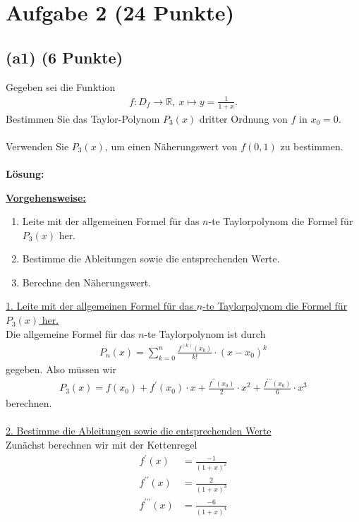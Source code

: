 \section*{Aufgabe 2 (24 Punkte)}
\vspace{0.4cm}
\subsection*{(a1) (6 Punkte)}
Gegeben sei die Funktion
\begin{align*}
f: D_f \to \mathbb{R}, \ x \mapsto y= \frac{1}{1+x}.
\end{align*}
Bestimmen Sie das Taylor-Polynom $P_3(x)$ dritter Ordnung von $f$ in $x_0 = 0$.\\
\\
Verwenden Sie $P_3(x)$, um einen Näherungswert von $f(0,1)$ zu bestimmen.
\\
\\
\textbf{Lösung:}
\begin{mdframed}
\underline{\textbf{Vorgehensweise:}}
\begin{enumerate}
\item Leite mit der allgemeinen Formel für das $n$-te Taylorpolynom die Formel für $P_3(x)$ her.
\item Bestimme die Ableitungen sowie die entsprechenden Werte.
\item Berechne den Näherungswert. 
\end{enumerate}
\end{mdframed}
\underline{1. Leite mit der allgemeinen Formel für das $n$-te Taylorpolynom die Formel für $P_3(x)$ her. }\\
Die allgemeine Formel für das $n$-te Taylorpolynom ist durch
\begin{align*}
P_n(x) = \sum \limits_{k=0}^n \frac{f^{(k)}(x_0)}{k!} \cdot (x-x_0)^k
\end{align*}
gegeben. Also müssen wir
\begin{align*}
P_3(x) 
= f(x_0) + f^\prime(x_0)\cdot x + \frac{f^{\prime \prime}(x_0)}{2}\cdot x^2+
\frac{f^{\prime \prime \prime}(x_0)}{6} \cdot x^3
\end{align*}
berechnen.
\\ 
\\
\underline{2. Bestimme die Ableitungen sowie die entsprechenden Werte}\\
Zunächst berechnen wir mit der Kettenregel
\begin{align*}
f^\prime(x) &= \frac{-1}{(1+x)^2}\\
f^{\prime \prime}(x) &= \frac{2}{(1+x)^3}\\
f^{\prime \prime \prime}(x) &= \frac{-6}{(1+x)^4}
\end{align*}
